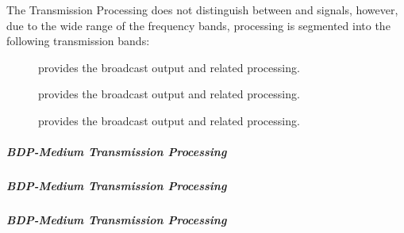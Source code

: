 The \RF Transmission Processing does not distinguish between \ATV and \DTV \RF signals, however, due to the wide range of the frequency bands, processing is segmented into the following transmission bands:
\begin{description}
	\item[\TVVHFLow] provides the \TVVHFLow broadcast output and related \RF processing.%
	\item[\TVVHFHigh] provides the \TVVHFHigh broadcast output and related \RF processing.%
	\item[\TVUHF] provides the \TVUHF broadcast output and related \RF processing.
\end{description}


\subparagraph{BDP-Medium \TVVHFLow \RF Transmission Processing}
\label{loc:BDP-Medium_RF_TVVHFLo_Transmission}
\renewcommand{\ThisSubSegment}{BDP-Medium \TVVHFLow RF\xspace}%


\subparagraph{BDP-Medium \TVVHFHigh \RF Transmission Processing}
\label{loc:BDP-Medium_RF_TVVHFHi_Transmission}
\renewcommand{\ThisSubSegment}{BDP-Medium \TVVHFHigh RF\xspace}%


\subparagraph{BDP-Medium \TVUHF \RF Transmission Processing}
\label{loc:BDP-Medium_RF_TVUHF_Transmission}
\renewcommand{\ThisSubSegment}{BDP-Medium \TVUHF RF\xspace}%

